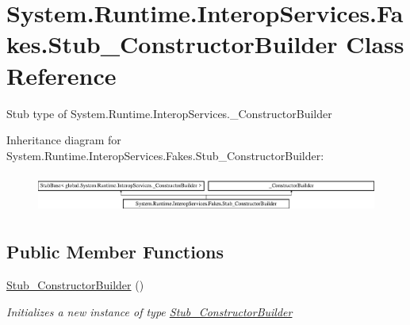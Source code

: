 \hypertarget{class_system_1_1_runtime_1_1_interop_services_1_1_fakes_1_1_stub___constructor_builder}{\section{System.\-Runtime.\-Interop\-Services.\-Fakes.\-Stub\-\_\-\-Constructor\-Builder Class Reference}
\label{class_system_1_1_runtime_1_1_interop_services_1_1_fakes_1_1_stub___constructor_builder}
}


Stub type of System.\-Runtime.\-Interop\-Services.\-\_\-\-Constructor\-Builder 


Inheritance diagram for System.\-Runtime.\-Interop\-Services.\-Fakes.\-Stub\-\_\-\-Constructor\-Builder\-:\begin{figure}[H]
\begin{center}
\leavevmode
\includegraphics[height=1.293303cm]{class_system_1_1_runtime_1_1_interop_services_1_1_fakes_1_1_stub___constructor_builder}
\end{center}
\end{figure}
\subsection*{Public Member Functions}
\begin{DoxyCompactItemize}
\item 
\hyperlink{class_system_1_1_runtime_1_1_interop_services_1_1_fakes_1_1_stub___constructor_builder_ad153ab07b491a8f6fc7732cfe96fb506}{Stub\-\_\-\-Constructor\-Builder} ()
\begin{DoxyCompactList}\small\item\em Initializes a new instance of type \hyperlink{class_system_1_1_runtime_1_1_interop_services_1_1_fakes_1_1_stub___constructor_builder}{Stub\-\_\-\-Constructor\-Builder}\end{DoxyCompactList}\end{DoxyCompactItemize}
